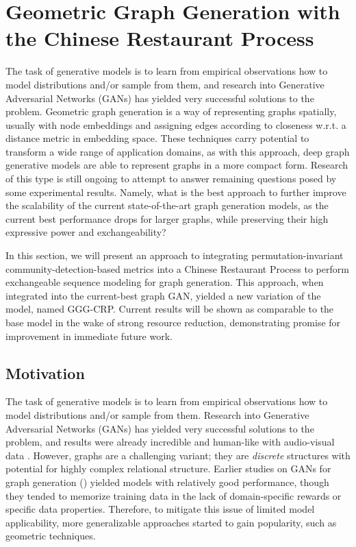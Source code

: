 \section{Geometric Graph Generation with the Chinese Restaurant Process}
\label{sec: gggcrp}

The task of generative models is to learn from empirical observations how to model distributions and/or sample from them, and research into Generative Adversarial Networks (GANs) has yielded very successful solutions to the problem. Geometric graph generation is a way of representing graphs spatially, usually with node embeddings and assigning edges according to closeness w.r.t. a distance metric in embedding space. These techniques carry potential to transform a wide range of application domains, as with this approach, deep graph generative models are able to represent graphs in a more compact form. Research of this type is still ongoing to attempt to answer remaining questions posed by some experimental results. Namely, what is the best approach to further improve the scalability of the current state-of-the-art graph generation models, as the current best performance drops for larger graphs, while preserving their high expressive power and exchangeability?

In this section, we will present an approach to integrating permutation-invariant community-detection-based metrics into a Chinese Restaurant Process to perform exchangeable sequence modeling for graph generation. This approach, when integrated into the current-best graph GAN, yielded a new variation of the model, named GGG-CRP. Current results will be shown as comparable to the base model in the wake of strong resource reduction, demonstrating promise for improvement in immediate future work.

\subsection{Motivation}

The task of generative models is to learn from empirical observations how to
model distributions and/or sample from them. Research into Generative Adversarial Networks (GANs) has yielded very successful solutions to the problem, and results were already incredible and human-like with audio-visual data \cite{karras_analyzing_2020}. However, graphs are a challenging variant; they are \emph{discrete} structures with potential for highly complex relational structure. 
Earlier studies on GANs for graph generation (\cite{bojchevski_netgan_2018, de_cao_molgan_2018}) yielded models with relatively good performance, though they tended to memorize training data in the lack of domain-specific rewards or specific data properties. Therefore, to mitigate this issue of limited model applicability, more generalizable approaches started to gain popularity, such as geometric techniques.

